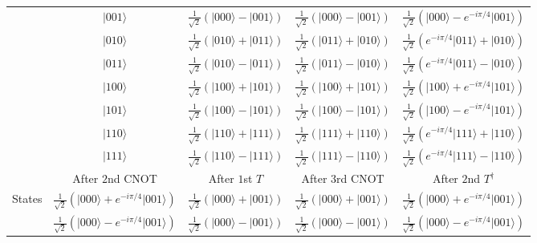 \documentclass[en]{sol-man}
\begin{document}
\begin{pf}
\begin{table}[h]
\begin{tabular}{|c|c|c|c|c|}
             & $\lvert 001\rangle$ & $\frac{1}{\sqrt{2}}(\lvert 000\rangle-\lvert 001\rangle)$ & $\frac{1}{\sqrt{2}}(\lvert 000\rangle-\lvert 001\rangle)$ & $\frac{1}{\sqrt{2}}(\lvert 000\rangle-e^{-i\pi/4}\lvert 001\rangle)$ \\ \cline{2-5} 
             & $\lvert 010\rangle$ & $\frac{1}{\sqrt{2}}(\lvert 010\rangle+\lvert 011\rangle)$ & $\frac{1}{\sqrt{2}}(\lvert 011\rangle+\lvert 010\rangle)$ & $\frac{1}{\sqrt{2}}(e^{-i\pi/4}\lvert 011\rangle+\lvert 010\rangle)$ \\ \cline{2-5} 
             & $\lvert 011\rangle$ & $\frac{1}{\sqrt{2}}(\lvert 010\rangle-\lvert 011\rangle)$ & $\frac{1}{\sqrt{2}}(\lvert 011\rangle-\lvert 010\rangle)$ & $\frac{1}{\sqrt{2}}(e^{-i\pi/4}\lvert 011\rangle-\lvert 010\rangle)$ \\ \cline{2-5} 
             & $\lvert 100\rangle$ & $\frac{1}{\sqrt{2}}(\lvert 100\rangle+\lvert 101\rangle)$ & $\frac{1}{\sqrt{2}}(\lvert 100\rangle+\lvert 101\rangle)$ & $\frac{1}{\sqrt{2}}(\lvert 100\rangle+e^{-i\pi/4}\lvert 101\rangle)$ \\ \cline{2-5} 
             & $\lvert 101\rangle$ & $\frac{1}{\sqrt{2}}(\lvert 100\rangle-\lvert 101\rangle)$ & $\frac{1}{\sqrt{2}}(\lvert 100\rangle-\lvert 101\rangle)$ & $\frac{1}{\sqrt{2}}(\lvert 100\rangle-e^{-i\pi/4}\lvert 101\rangle)$ \\ \cline{2-5} 
             & $\lvert 110\rangle$ & $\frac{1}{\sqrt{2}}(\lvert 110\rangle+\lvert 111\rangle)$ & $\frac{1}{\sqrt{2}}(\lvert 111\rangle+\lvert 110\rangle)$ & $\frac{1}{\sqrt{2}}(e^{-i\pi/4}\lvert 111\rangle+\lvert 110\rangle)$ \\ \cline{2-5} 
             & $\lvert 111\rangle$ & $\frac{1}{\sqrt{2}}(\lvert 110\rangle-\lvert 111\rangle)$ & $\frac{1}{\sqrt{2}}(\lvert 111\rangle-\lvert 110\rangle)$ & $\frac{1}{\sqrt{2}}(e^{-i\pi/4}\lvert 111\rangle-\lvert 110\rangle)$ \\ \hline\hline
             & After $2$nd CNOT & After $1$st $T$ & After $3$rd CNOT & After $2$nd $T^{\dagger}$ \\ \hline
            \multirow{8}{*}{States} & $\frac{1}{\sqrt{2}}(\lvert 000\rangle+e^{-i\pi/4}\lvert 001\rangle)$ & $\frac{1}{\sqrt{2}}(\lvert 000\rangle+\lvert 001\rangle)$ & $\frac{1}{\sqrt{2}}(\lvert 000\rangle+\lvert 001\rangle)$ & $\frac{1}{\sqrt{2}}(\lvert 000\rangle+e^{-i\pi/4}\lvert 001\rangle)$ \\ \cline{2-5} 
             & $\frac{1}{\sqrt{2}}(\lvert 000\rangle-e^{-i\pi/4}\lvert 001\rangle)$ & $\frac{1}{\sqrt{2}}(\lvert 000\rangle-\lvert 001\rangle)$ & $\frac{1}{\sqrt{2}}(\lvert 000\rangle-\lvert 001\rangle)$ & $\frac{1}{\sqrt{2}}(\lvert 000\rangle-e^{-i\pi/4}\lvert 001\rangle)$ \\ \cline{2-5} 

\end{tabular}
\end{table}
\end{pf}
\end{document}
